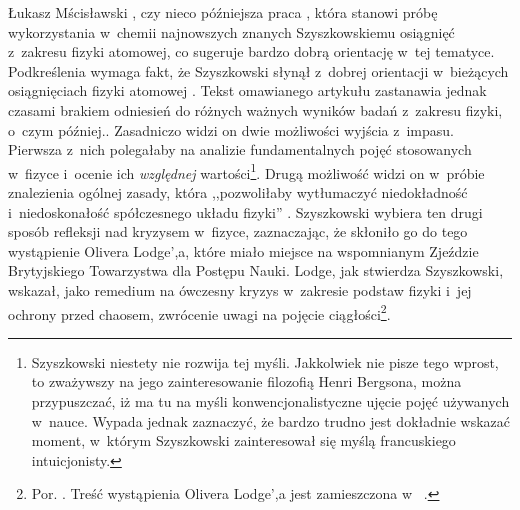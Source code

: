 \begin{artplenv}{Łukasz Mścisławski}
{%
\parencite[][]{szyszkowski_1911-1}, %
 czy nieco późniejsza praca 
\parencite[][]{szyszkowski_1918}, %
 która stanowi próbę wykorzystania w~chemii najnowszych znanych Szyszkowskiemu osiągnięć z~zakresu fizyki atomowej, co sugeruje bardzo dobrą orientację w~tej tematyce. Podkreślenia wymaga fakt, że Szyszkowski słynął z~dobrej orientacji w~bieżących osiągnięciach fizyki atomowej 
\parencite[por. np.][s.~784]{swietoslawski_sp_1931}. %
 Tekst omawianego artykułu zastanawia jednak czasami brakiem odniesień do różnych ważnych wyników badań z~zakresu fizyki, o~czym później.}.
 Zasadniczo widzi on dwie możliwości wyjścia z~impasu. Pierwsza z~nich polegałaby na analizie fundamentalnych pojęć stosowanych w~fizyce i~ocenie ich \textit{względnej} wartości\footnote{Szyszkowski niestety nie rozwija tej myśli. Jakkolwiek nie pisze tego wprost, to zważywszy na jego zainteresowanie filozofią Henri Bergsona, można przypuszczać, iż ma tu na myśli konwencjonalistyczne ujęcie pojęć używanych w~nauce. Wypada jednak zaznaczyć, że bardzo trudno jest dokładnie wskazać moment, w~którym Szyszkowski zainteresował się myślą francuskiego intuicjonisty.}. Drugą możliwość widzi on w~próbie znalezienia ogólnej zasady, która ,,pozwoliłaby wytłumaczyć niedokładność i~niedoskonałość spółczesnego układu fizyki'' 
\parencite[][s.~44]{szyszkowski_o_1916}. %
 Szyszkowski wybiera ten drugi sposób refleksji nad kryzysem w~fizyce, zaznaczając, że skłoniło go do tego wystąpienie Olivera Lodge',a, które miało miejsce na wspomnianym Zjeździe Brytyjskiego Towarzystwa dla Postępu Nauki. Lodge, jak stwierdza Szyszkowski, wskazał, jako remedium na ówczesny kryzys w~zakresie podstaw fizyki i~jej ochrony przed chaosem, zwrócenie uwagi na pojęcie ciągłości\footnote{Por. 
\parencite[][s.~44–45]{szyszkowski_o_1916}. %
 Treść wystąpienia Olivera Lodge',a jest zamieszczona w~
\parencite[][o~ciągłości zwłaszcza s.~5-10]{british_association_for_the_advancement_of_science_report_1914}.%
}.


\end{artplenv}
